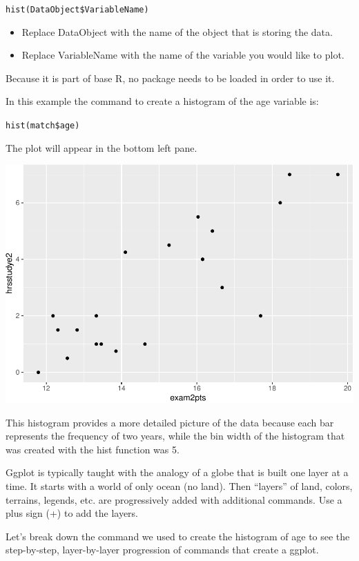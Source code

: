 \documentclass[
]{book}
\providecommand{\tightlist}{%
  \setlength{\itemsep}{0pt}\setlength{\parskip}{0pt}}
\begin{document}
\texttt{hist(DataObject\$VariableName)}

\begin{itemize}
\tightlist
\item
  Replace DataObject with the name of the object that is storing the data.\\
\item
  Replace VariableName with the name of the variable you would like to plot.
\end{itemize}

Because it is part of base R, no package needs to be loaded in order to use it.

In this example the command to create a histogram of the age variable is:

\texttt{hist(match\$age)}

The plot will appear in the bottom left pane.

\includegraphics{Tools-for-working-with-data-211_files/figure-latex/unnamed-chunk-2-1.pdf}

This histogram provides a more detailed picture of the data because each bar represents the frequency of two years, while the bin width of the histogram that was created with the hist function was 5.

Ggplot is typically taught with the analogy of a globe that is built one layer at a time. It starts with a world of only ocean (no land). Then ``layers'' of land, colors, terrains, legends, etc. are progressively added with additional commands. Use a plus sign (+) to add the layers.

Let's break down the command we used to create the histogram of age to see the step-by-step, layer-by-layer progression of commands that create a ggplot.
\end{document}
